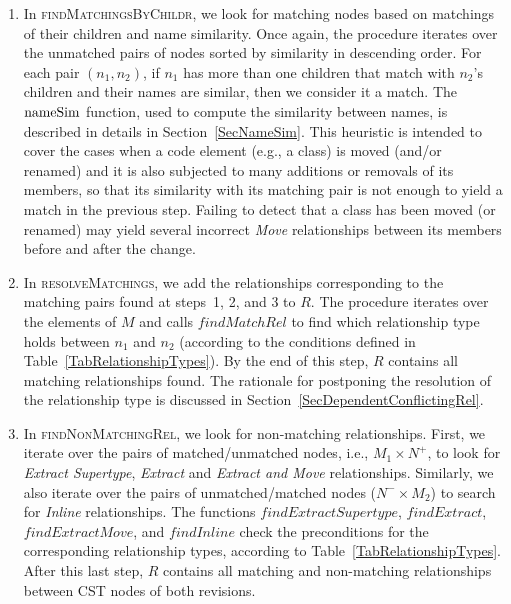 \begin{enumerate}
\item In \textsc{findMatchingsByChildr}, we look for matching nodes based on matchings of their children and name similarity. 
Once again, the procedure iterates over the unmatched pairs of nodes sorted by similarity in descending order.
For each pair $(n_1, n_2)$, if $n_1$ has more than one children that match with $n_2$'s children and their names are similar, then we consider it a match. The $\operatorname{nameSim}$ function, used to compute the similarity between names, is described in details in Section~\ref{SecNameSim}.
This heuristic is intended to cover the cases when a code element (e.g., a class) is moved (and/or renamed) and it is also subjected to many additions or removals of its members, so that its similarity with its matching pair is not enough to yield a match in the previous step.
Failing to detect that a class has been moved (or renamed) may yield several incorrect \textit{Move} relationships between its members before and after the change.


\item In \textsc{resolveMatchings}, we add the relationships corresponding to the matching pairs found at steps~1, 2, and 3 to $R$.
The procedure iterates over the elements of $M$ and calls $\mathit{findMatchRel}$ to find which relationship type holds between $n_1$ and $n_2$ (according to the conditions defined in Table~\ref{TabRelationshipTypes}).
By the end of this step, $R$ contains all matching relationships found.
The rationale for postponing the resolution of the relationship type is discussed in Section~\ref{SecDependentConflictingRel}.

\item In \textsc{findNonMatchingRel}, we look for non-matching relationships.
First, we iterate over the pairs of matched/unmatched nodes, i.e., $M_1 \times N^+$, to look for \textit{Extract Supertype}, \textit{Extract} and \textit{Extract and Move} relationships.
Similarly, we also iterate over the pairs of unmatched/matched nodes ($N^- \times M_2$) to search for \textit{Inline} relationships.
The functions $findExtractSupertype$, $findExtract$, $findExtractMove$, and $findInline$ check the  preconditions for the corresponding relationship types, according to Table~\ref{TabRelationshipTypes}.
After this last step, $R$ contains all matching and non-matching relationships between CST nodes of both revisions.
\end{enumerate}






